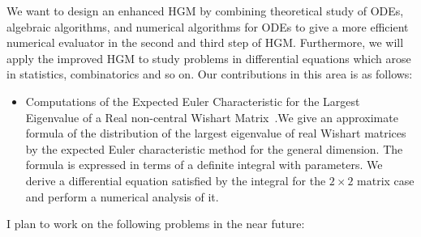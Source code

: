 \documentclass[10pt,a4paper]{article}
\begin{document}
  We want to design an enhanced HGM by combining theoretical study of ODEs, algebraic algorithms, and numerical algorithms for ODEs to give a more efficient numerical evaluator in the second and third step of HGM. Furthermore, we will apply the improved HGM to study problems in differential equations which arose in statistics, combinatorics and so on.  Our contributions in this area is as follows: 

\begin{itemize}
\item Computations of the Expected Euler Characteristic for the Largest Eigenvalue of a Real non-central Wishart Matrix~\cite{Takayama2019}.We give an approximate formula of the distribution of the largest
eigenvalue of real Wishart matrices by the expected Euler characteristic
method for the general dimension.
The formula is expressed in terms of a definite integral with parameters.
We derive a differential equation satisfied by the integral
for the $2 \times 2$ matrix case and perform a numerical analysis of it.
\end{itemize}


I plan to work on the following problems in the near future:
\end{document}

